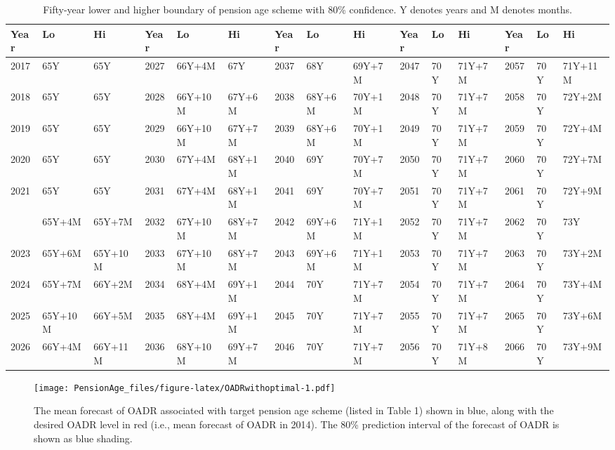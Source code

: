\documentclass[11pt,a4paper,]{article}
\begin{document}
\begin{table}

\caption{\label{tab:pensionagetables2}Fifty-year lower and higher boundary of pension age scheme with 80\% confidence. Y denotes years and M denotes months.}
\centering
\fontsize{7}{9}\selectfont
\begin{tabular}[t]{lllllllllllllll}
\toprule
Year & Lo & Hi & Year & Lo & Hi & Year & Lo & Hi & Year & Lo & Hi & Year & Lo & Hi\\
\midrule
2017 & 65Y & 65Y & 2027 & 66Y+4M & 67Y & 2037 & 68Y & 69Y+7M & 2047 & 70Y & 71Y+7M & 2057 & 70Y & 71Y+11M\\
2018 & 65Y & 65Y & 2028 & 66Y+10M & 67Y+6M & 2038 & 68Y+6M & 70Y+1M & 2048 & 70Y & 71Y+7M & 2058 & 70Y & 72Y+2M\\
2019 & 65Y & 65Y & 2029 & 66Y+10M & 67Y+7M & 2039 & 68Y+6M & 70Y+1M & 2049 & 70Y & 71Y+7M & 2059 & 70Y & 72Y+4M\\
2020 & 65Y & 65Y & 2030 & 67Y+4M & 68Y+1M & 2040 & 69Y & 70Y+7M & 2050 & 70Y & 71Y+7M & 2060 & 70Y & 72Y+7M\\
2021 & 65Y & 65Y & 2031 & 67Y+4M & 68Y+1M & 2041 & 69Y & 70Y+7M & 2051 & 70Y & 71Y+7M & 2061 & 70Y & 72Y+9M\\
\addlinespace
2022 & 65Y+4M & 65Y+7M & 2032 & 67Y+10M & 68Y+7M & 2042 & 69Y+6M & 71Y+1M & 2052 & 70Y & 71Y+7M & 2062 & 70Y & 73Y\\
2023 & 65Y+6M & 65Y+10M & 2033 & 67Y+10M & 68Y+7M & 2043 & 69Y+6M & 71Y+1M & 2053 & 70Y & 71Y+7M & 2063 & 70Y & 73Y+2M\\
2024 & 65Y+7M & 66Y+2M & 2034 & 68Y+4M & 69Y+1M & 2044 & 70Y & 71Y+7M & 2054 & 70Y & 71Y+7M & 2064 & 70Y & 73Y+4M\\
2025 & 65Y+10M & 66Y+5M & 2035 & 68Y+4M & 69Y+1M & 2045 & 70Y & 71Y+7M & 2055 & 70Y & 71Y+7M & 2065 & 70Y & 73Y+6M\\
2026 & 66Y+4M & 66Y+11M & 2036 & 68Y+10M & 69Y+7M & 2046 & 70Y & 71Y+7M & 2056 & 70Y & 71Y+8M & 2066 & 70Y & 73Y+9M\\
\bottomrule
\end{tabular}
\end{table}

\begin{figure}
\centering
\texttt{[image: PensionAge\_files/figure-latex/OADRwithoptimal-1.pdf]}
\caption{\label{fig:OADRwithoptimal}The mean forecast of OADR associated with target pension age scheme (listed in Table 1) shown in blue, along with the desired OADR level in red (i.e., mean forecast of OADR in 2014). The 80\% prediction interval of the forecast of OADR is shown as blue shading.}
\end{figure}
\end{document}
